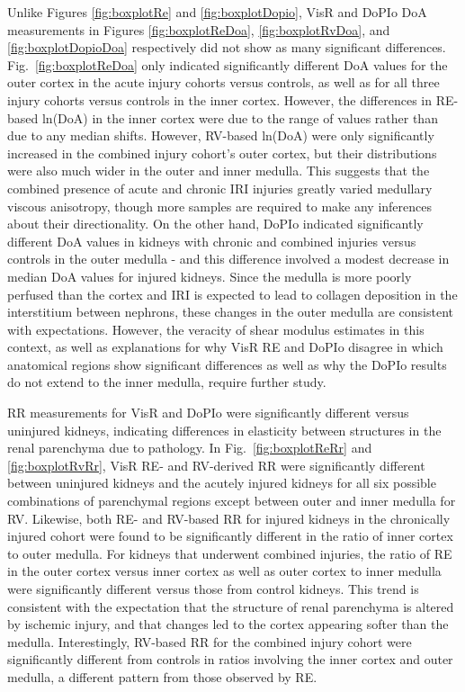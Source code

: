 Unlike Figures \ref{fig:boxplotRe} and \ref{fig:boxplotDopio}, VisR and DoPIo DoA measurements in Figures \ref{fig:boxplotReDoa}, \ref{fig:boxplotRvDoa}, and \ref{fig:boxplotDopioDoa} respectively did not show as many significant differences. Fig.~\ref{fig:boxplotReDoa} only indicated significantly different DoA values for the outer cortex in the acute injury cohorts versus controls, as well as for all three injury cohorts versus controls in the inner cortex. However, the differences in RE-based ln(DoA) in the inner cortex were due to the range of values rather than due to any median shifts. However, RV-based ln(DoA) were only significantly increased in the combined injury cohort's outer cortex, but their distributions were also much wider in the outer and inner medulla. This suggests that the combined presence of acute and chronic IRI injuries greatly varied medullary viscous anisotropy, though more samples are required to make any inferences about their directionality. On the other hand, DoPIo indicated significantly different DoA values in kidneys with chronic and combined injuries versus controls in the outer medulla - and this difference involved a modest decrease in median DoA values for injured kidneys. Since the medulla is more poorly perfused than the cortex and IRI is expected to lead to collagen deposition in the interstitium between nephrons, these changes in the outer medulla are consistent with expectations. However, the veracity of shear modulus estimates in this context, as well as explanations for why VisR RE and DoPIo disagree in which anatomical regions show significant differences as well as why the DoPIo results do not extend to the inner medulla, require further study.

RR measurements for VisR and DoPIo were significantly different versus uninjured kidneys, indicating differences in elasticity between structures in the renal parenchyma due to pathology. In Fig.~\ref{fig:boxplotReRr} and \ref{fig:boxplotRvRr}, VisR RE- and RV-derived RR were significantly different between uninjured kidneys and the acutely injured kidneys for all six possible combinations of parenchymal regions except between outer and inner medulla for RV. Likewise, both RE- and RV-based RR for injured kidneys in the chronically injured cohort were found to be significantly different in the ratio of inner cortex to outer medulla. For kidneys that underwent combined injuries, the ratio of RE in the outer cortex versus inner cortex as well as outer cortex to inner medulla were significantly different versus those from control kidneys. This trend is consistent with the expectation that the structure of renal parenchyma is altered by ischemic injury, and that changes led to the cortex appearing softer than the medulla. Interestingly, RV-based RR for the combined injury cohort were significantly different from controls in ratios involving the inner cortex and outer medulla, a different pattern from those observed by RE. 

